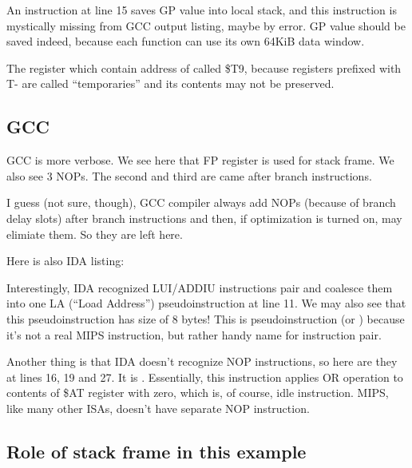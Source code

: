 An instruction at line 15 saves GP value into local stack, and this instruction is mystically missing
from GCC output listing, maybe by error.
GP value should be saved indeed, because each function can use its own 64KiB data window.

The register which contain address of \puts called \$T9, because registers prefixed with T- are called
``temporaries'' and its contents may not be preserved.

\subsection{\NonOptimizing GCC}



\NonOptimizing GCC is more verbose.
We see here that FP register is used for stack frame.
We also see 3 \ac{NOP}s.
The second and third are came after branch instructions.

I guess (not sure, though), GCC compiler always add \ac{NOP}s (because of branch delay slots) after branch
instructions and then, if optimization is turned on, may elimiate them.
So they are left here.

Here is also IDA listing:



Interestingly, IDA recognized LUI/ADDIU instructions pair and coalesce them into one 
LA (``Load Address'') pseudoinstruction at line 11.
We may also see that this pseudoinstruction has size of 8 bytes!
This is pseudoinstruction (or ) because it's not a real MIPS instruction, but rather
handy name for instruction pair.

Another thing is that IDA doesn't recognize \ac{NOP} instructions, so here are they at lines 16, 19 and 27.
It is . Essentially, this instruction applies OR operation to contents of \$AT register
with zero, which is, of course, idle instruction. 
MIPS, like many other \ac{ISA}s, doesn't have separate \ac{NOP} instruction.

\subsection{Role of stack frame in this example}

